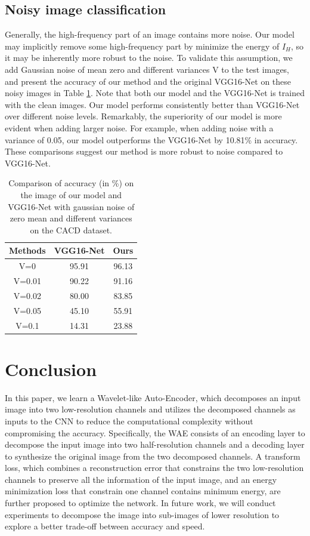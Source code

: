\documentclass[letterpaper]{article} %
\begin{document}
\subsection{Noisy image classification}
Generally, the high-frequency part of an image contains more noise. Our model may implicitly remove some high-frequency part by minimize the energy of $I_H$, so it may be inherently more robust to the noise. To validate this assumption, we add Gaussian noise of mean zero and different variances V to the test images, and present the accuracy of our method and the original VGG16-Net on these noisy images in Table \ref{table:cacd_noise}. Note that both our model and the VGG16-Net is trained with the clean images. Our model performs consistently better than VGG16-Net over different noise levels. Remarkably, the superiority of our model is more evident when adding larger noise. For example, when adding noise with a variance of 0.05, our model outperforms the VGG16-Net by 10.81\% in accuracy. These comparisons suggest our method is more robust to noise compared to VGG16-Net.

\begin{table}[htbp]
\centering
\begin{tabular}{c|c|c}
\hline
Methods & VGG16-Net & Ours \\
\hline
V=0   & 95.91 & 96.13    \\
V=0.01   & 90.22  &  91.16     \\
V=0.02   & 80.00  &  83.85     \\
V=0.05   & 45.10  &  55.91     \\
V=0.1   & 14.31  &   23.88    \\
\hline
\end{tabular}
\caption{Comparison of accuracy (in \%) on the image of our model and VGG16-Net with gaussian noise of zero mean and different variances on the CACD dataset.}
\label{table:cacd_noise}
\end{table}


\section{Conclusion}
In this paper, we learn a Wavelet-like Auto-Encoder, which decomposes an input image into two low-resolution channels and utilizes the decomposed channels as inputs to the CNN to reduce the computational complexity without compromising the accuracy. Specifically, the WAE consists of an encoding layer to decompose the input image into two half-resolution channels and a decoding layer to synthesize the original image from the two decomposed channels. A transform loss, which combines a reconstruction error that constrains the two low-resolution channels to preserve all the information of the input image, and an energy minimization loss that constrain one channel contains minimum energy, are further proposed to optimize the network. 
In future work, we will conduct experiments to decompose the image into sub-images of lower resolution to explore a better trade-off between accuracy and speed.



\end{document}
